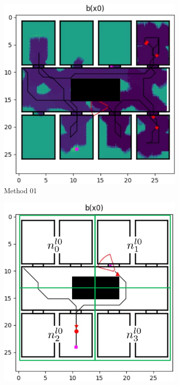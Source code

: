 \begin{figure}[b]
    \centering
    \begin{subfigure}[b]{0.49\textwidth}
        \includegraphics[width=\textwidth]{Report/images/experiments/M1_envbig_problem1_blackbox.png}
        \caption{Method 01}
        \label{subfig:problem1_M1}
    \end{subfigure}
    \begin{subfigure}[b]{0.49\textwidth}
         \includegraphics[width=\textwidth]{Report/images/experiments/M2_envbig_problem1_nodes.png}

\end{subfigure}
\end{figure}
